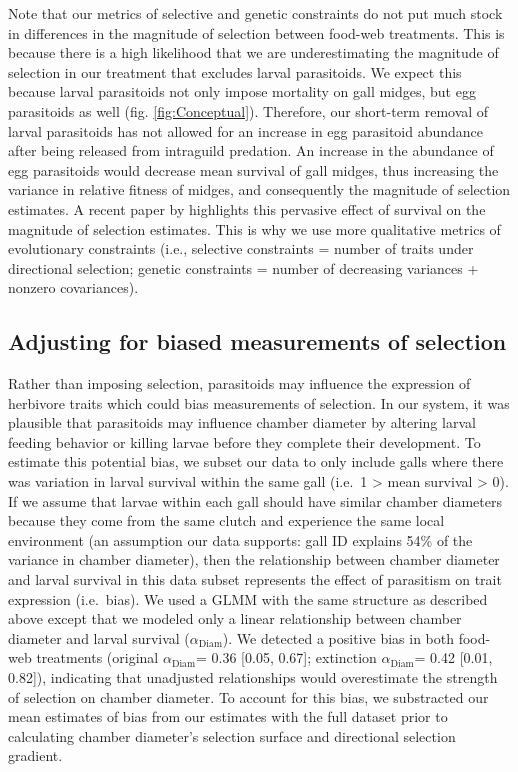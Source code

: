\documentclass[11pt,]{article}
\begin{document}
Note that our metrics of selective and genetic constraints do not put
much stock in differences in the magnitude of selection between food-web
treatments. This is because there is a high likelihood that we are
underestimating the magnitude of selection in our treatment that
excludes larval parasitoids. We expect this because larval parasitoids
not only impose mortality on gall midges, but egg parasitoids as well
(fig. \ref{fig:Conceptual}). Therefore, our short-term removal of larval
parasitoids has not allowed for an increase in egg parasitoid abundance
after being released from intraguild predation. An increase in the
abundance of egg parasitoids would decrease mean survival of gall
midges, thus increasing the variance in relative fitness of midges, and
consequently the magnitude of selection estimates. A recent paper by
\citet{Hunter2018} highlights this pervasive effect of survival on the
magnitude of selection estimates. This is why we use more qualitative
metrics of evolutionary constraints (i.e., selective constraints =
number of traits under directional selection; genetic constraints =
number of decreasing variances + nonzero covariances).

\subsection{Adjusting for biased measurements of
selection}\label{adjusting-for-biased-measurements-of-selection}

Rather than imposing selection, parasitoids may influence the expression
of herbivore traits which could bias measurements of selection. In our
system, it was plausible that parasitoids may influence chamber diameter
by altering larval feeding behavior or killing larvae before they
complete their development. To estimate this potential bias, we subset
our data to only include galls where there was variation in larval
survival within the same gall (i.e.~1 \textgreater{} mean survival
\textgreater{} 0). If we assume that larvae within each gall should have
similar chamber diameters because they come from the same clutch and
experience the same local environment (an assumption our data supports:
gall ID explains 54\% of the variance in chamber diameter), then the
relationship between chamber diameter and larval survival in this data
subset represents the effect of parasitism on trait expression
(i.e.~bias). We used a GLMM with the same structure as described above
except that we modeled only a linear relationship between chamber
diameter and larval survival (\(\alpha_{\text{Diam}}\)). We detected a
positive bias in both food-web treatments (original
\(\alpha_{\text{Diam}}\)= 0.36 {[}0.05, 0.67{]}; extinction
\(\alpha_{\text{Diam}}\)= 0.42 {[}0.01, 0.82{]}), indicating that
unadjusted relationships would overestimate the strength of selection on
chamber diameter. To account for this bias, we substracted our mean
estimates of bias from our estimates with the full dataset prior to
calculating chamber diameter's selection surface and directional
selection gradient.
\end{document}
